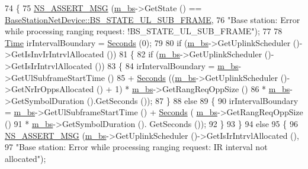 \begin{DoxyCode}
74 \{
75   \hyperlink{assert_8h_aff5ece9066c74e681e74999856f08539}{NS\_ASSERT\_MSG} (\hyperlink{classns3_1_1BSLinkManager_a03e8b376dd28651abfeded291ea52fc8}{m\_bs}->GetState () == 
      \hyperlink{classns3_1_1BaseStationNetDevice_a70b3d78837bcc09df385146fb7f51498aea64791fa58c182a50bf32da2b0a6f52}{BaseStationNetDevice::BS\_STATE\_UL\_SUB\_FRAME},
76                  \textcolor{stringliteral}{"Base station: Error while processing ranging request: !BS\_STATE\_UL\_SUB\_FRAME"});
77 
78   \hyperlink{namespacens3_1_1TracedValueCallback_a7ffd3e7c142ffe7c8a1d2db9b8de38ec}{Time} irIntervalBoundary = \hyperlink{group__timecivil_ga33c34b816f8ff6628e33d5c8e9713b9e}{Seconds} (0);
79 
80   \textcolor{keywordflow}{if} (\hyperlink{classns3_1_1BSLinkManager_a03e8b376dd28651abfeded291ea52fc8}{m\_bs}->GetUplinkScheduler ()->GetIsInvIrIntrvlAllocated ())
81     \{
82       \textcolor{keywordflow}{if} (\hyperlink{classns3_1_1BSLinkManager_a03e8b376dd28651abfeded291ea52fc8}{m\_bs}->GetUplinkScheduler ()->GetIsIrIntrvlAllocated ())
83         \{
84           irIntervalBoundary = \hyperlink{classns3_1_1BSLinkManager_a03e8b376dd28651abfeded291ea52fc8}{m\_bs}->GetUlSubframeStartTime ()
85             + \hyperlink{group__timecivil_ga33c34b816f8ff6628e33d5c8e9713b9e}{Seconds} ((\hyperlink{classns3_1_1BSLinkManager_a03e8b376dd28651abfeded291ea52fc8}{m\_bs}->GetUplinkScheduler ()->GetNrIrOppsAllocated () + 1) * 
      \hyperlink{classns3_1_1BSLinkManager_a03e8b376dd28651abfeded291ea52fc8}{m\_bs}->GetRangReqOppSize ()
86                        * \hyperlink{classns3_1_1BSLinkManager_a03e8b376dd28651abfeded291ea52fc8}{m\_bs}->GetSymbolDuration ().GetSeconds ());
87         \}
88       \textcolor{keywordflow}{else}
89         \{
90           irIntervalBoundary = \hyperlink{classns3_1_1BSLinkManager_a03e8b376dd28651abfeded291ea52fc8}{m\_bs}->GetUlSubframeStartTime () + \hyperlink{group__timecivil_ga33c34b816f8ff6628e33d5c8e9713b9e}{Seconds} (
      \hyperlink{classns3_1_1BSLinkManager_a03e8b376dd28651abfeded291ea52fc8}{m\_bs}->GetRangReqOppSize ()
91                                                                           * \hyperlink{classns3_1_1BSLinkManager_a03e8b376dd28651abfeded291ea52fc8}{m\_bs}->GetSymbolDuration ().
      GetSeconds ());
92         \}
93     \}
94   \textcolor{keywordflow}{else}
95     \{
96       \hyperlink{assert_8h_aff5ece9066c74e681e74999856f08539}{NS\_ASSERT\_MSG} (\hyperlink{classns3_1_1BSLinkManager_a03e8b376dd28651abfeded291ea52fc8}{m\_bs}->GetUplinkScheduler ()->GetIsIrIntrvlAllocated (),
97                      \textcolor{stringliteral}{"Base station: Error while processing ranging request: IR interval not allocated"});

\end{DoxyCode}
